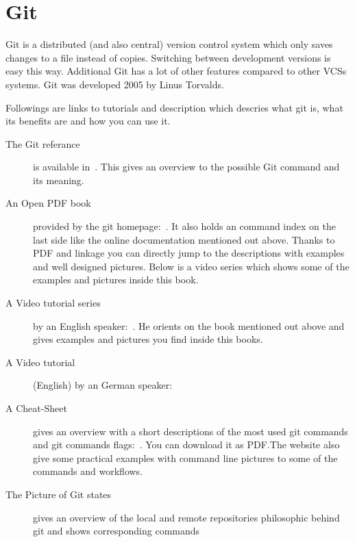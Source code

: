 \section{Git}%
\label{sec:git}
Git is a distributed (and also central) version control system which only saves
changes to a file instead of copies. Switching between development versions is
easy this way. Additional Git has a lot of other features compared to other
\glspl{VCS} systems. Git was developed 2005 by Linus Torvalds.

Followings are links to tutorials and description which descries what git is,
what its benefits are  and how you can use it.


\begin{description}
    \item[The Git referance] is available in~\cite{gitdoc}. This gives
        an overview to the possible Git command and its meaning.
    \item[An Open PDF book] provided by the git homepage:~\cite{Chacon2014}. It
        also holds an command index on the last side like the online
        documentation mentioned out above. Thanks to PDF and linkage you
        can directly jump to the descriptions with examples and well designed
        pictures. Below is a video series which shows some of the examples and
        pictures inside this book.
    \item[A Video tutorial series] by an English
        speaker:~\cite{gitvideotutorial_en}.
        He orients on the book mentioned out above and gives examples and
        pictures you find inside this books.
    \item[A Video tutorial] (English) by an German
        speaker:~\cite{gitvideotutorial_de_en}
    \item[A Cheat-Sheet] gives an overview with a short descriptions of the most
        used git commands and git commands flags:~\cite{git_cheat_sheet}. You
        can download it as PDF.\@ The website also give some practical examples
        with command line pictures to some of the commands and workflows.
    \item[The Picture of Git states] gives an overview of the local and remote
        repositories philosophic behind git and shows corresponding
        commands~\cite{git_picture}
\end{description}
